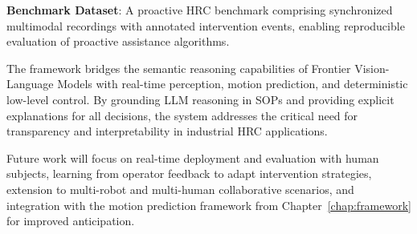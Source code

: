 \textbf{Benchmark Dataset}: A proactive HRC benchmark comprising synchronized multimodal recordings with annotated intervention events, enabling reproducible evaluation of proactive assistance algorithms.

The framework bridges the semantic reasoning capabilities of Frontier Vision-Language Models with real-time perception, motion prediction, and deterministic low-level control. By grounding LLM reasoning in SOPs and providing explicit explanations for all decisions, the system addresses the critical need for transparency and interpretability in industrial HRC applications.

Future work will focus on real-time deployment and evaluation with human subjects, learning from operator feedback to adapt intervention strategies, extension to multi-robot and multi-human collaborative scenarios, and integration with the motion prediction framework from Chapter~\ref{chap:framework} for improved anticipation.